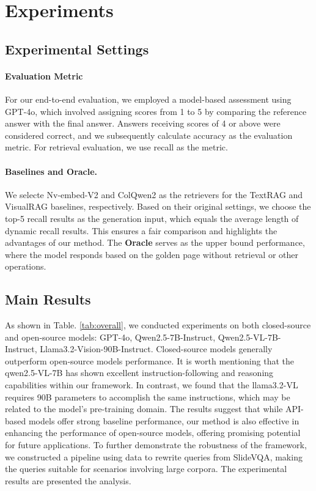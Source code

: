 \section{Experiments}

\subsection{Experimental Settings}
\paragraph{Evaluation Metric} For our end-to-end evaluation, we employed a model-based assessment using GPT-4o, which involved assigning scores from 1 to 5 by comparing the reference answer with the final answer. Answers receiving scores of 4 or above were considered correct, and we subsequently calculate accuracy as the evaluation metric. For retrieval evaluation, we use recall as the metric.

\paragraph{Baselines and Oracle.} 
We selecte Nv-embed-V2\cite{lee2024nv} and ColQwen2\cite{faysse2024colpali} as the retrievers for the TextRAG and VisualRAG baselines, respectively. Based on their original settings, we choose the top-5 recall results as the generation input, which equals the average length of dynamic recall results. This ensures a fair comparison and highlights the advantages of our method. The \textbf{Oracle} serves as the upper bound performance, where the model responds based on the golden page without retrieval or other operations. 

\subsection{Main Results}
As shown in Table. \ref{tab:overall}, we conducted experiments on both closed-source and open-source models: GPT-4o, Qwen2.5-7B-Instruct, Qwen2.5-VL-7B\cite{yang2024qwen2}-Instruct, Llama3.2-Vision-90B-Instruct. Closed-source models generally outperform open-source models performance. 
It is worth mentioning that the qwen2.5-VL-7B has shown excellent instruction-following and reasoning capabilities within our framework. In contrast, we found that the llama3.2-VL requires 90B parameters to accomplish the same instructions, which may be related to the model's pre-training domain.
The results suggest that while API-based models offer strong baseline performance, our method is also effective in enhancing the performance of open-source models, offering promising potential for future applications. 
To further demonstrate the robustness of the framework, we constructed a pipeline using data to rewrite queries from SlideVQA\cite{tanaka2023slidevqa}, making the queries suitable for scenarios involving large corpora. The experimental results are presented the analysis.
